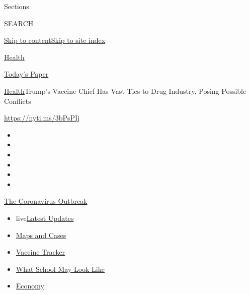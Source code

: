 Sections

SEARCH

\protect\hyperlink{site-content}{Skip to
content}\protect\hyperlink{site-index}{Skip to site index}

\href{https://www.nytimes.com/section/health}{Health}

\href{https://myaccount.nytimes.com/auth/login?response_type=cookie\&client_id=vi}{}

\href{https://www.nytimes.com/section/todayspaper}{Today's Paper}

\href{/section/health}{Health}\textbar{}Trump's Vaccine Chief Has Vast
Ties to Drug Industry, Posing Possible Conflicts

\url{https://nyti.ms/3bPsPIj}

\begin{itemize}
\item
\item
\item
\item
\item
\item
\end{itemize}

\href{https://www.nytimes.com/news-event/coronavirus?action=click\&pgtype=Article\&state=default\&region=TOP_BANNER\&context=storylines_menu}{The
Coronavirus Outbreak}

\begin{itemize}
\tightlist
\item
  live\href{https://www.nytimes.com/2020/08/02/world/coronavirus-updates.html?action=click\&pgtype=Article\&state=default\&region=TOP_BANNER\&context=storylines_menu}{Latest
  Updates}
\item
  \href{https://www.nytimes.com/interactive/2020/us/coronavirus-us-cases.html?action=click\&pgtype=Article\&state=default\&region=TOP_BANNER\&context=storylines_menu}{Maps
  and Cases}
\item
  \href{https://www.nytimes.com/interactive/2020/science/coronavirus-vaccine-tracker.html?action=click\&pgtype=Article\&state=default\&region=TOP_BANNER\&context=storylines_menu}{Vaccine
  Tracker}
\item
  \href{https://www.nytimes.com/interactive/2020/07/29/us/schools-reopening-coronavirus.html?action=click\&pgtype=Article\&state=default\&region=TOP_BANNER\&context=storylines_menu}{What
  School May Look Like}
\item
  \href{https://www.nytimes.com/live/2020/07/31/business/stock-market-today-coronavirus?action=click\&pgtype=Article\&state=default\&region=TOP_BANNER\&context=storylines_menu}{Economy}
\end{itemize}

